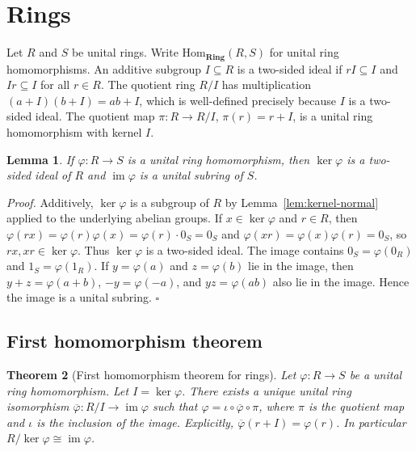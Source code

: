 \documentclass[11pt,letterpaper]{article}
\newcommand{\Map}[3]{#1 \colon #2 \to #3}
\newcommand{\RingHom}{\mathrm{Hom}_{\mathbf{Ring}}}
\newtheorem{theorem}{Theorem}
\newtheorem{lemma}[theorem]{Lemma}
\newenvironment{proof}{\noindent\textit{Proof.}}{\hfill\(\square\)}
\begin{document}
\section{Rings}

Let \(R\) and \(S\) be unital rings. Write \(\RingHom(R,S)\) for unital ring homomorphisms. An additive subgroup \(I\subseteq R\) is a two-sided ideal if \(rI\subseteq I\) and \(Ir\subseteq I\) for all \(r\in R\). The quotient ring \(R/I\) has multiplication \((a+I)(b+I)=ab+I\), which is well-defined precisely because \(I\) is a two-sided ideal. The quotient map \(\Map{\pi}{R}{R/I}\), \(\pi(r)=r+I\), is a unital ring homomorphism with kernel \(I\).

\begin{lemma}
\label{lem:ring-kernel}
If \(\Map{\varphi}{R}{S}\) is a unital ring homomorphism, then \(\ker\varphi\) is a two-sided ideal of \(R\) and \(\operatorname{im}\varphi\) is a unital subring of \(S\).
\end{lemma}

\begin{proof}
Additively, \(\ker\varphi\) is a subgroup of \(R\) by Lemma~\ref{lem:kernel-normal} applied to the underlying abelian groups. If \(x\in\ker\varphi\) and \(r\in R\), then \(\varphi(rx)=\varphi(r)\varphi(x)=\varphi(r)\cdot 0_S=0_S\) and \(\varphi(xr)=\varphi(x)\varphi(r)=0_S\), so \(rx,xr\in\ker\varphi\). Thus \(\ker\varphi\) is a two-sided ideal. The image contains \(0_S=\varphi(0_R)\) and \(1_S=\varphi(1_R)\). If \(y=\varphi(a)\) and \(z=\varphi(b)\) lie in the image, then \(y+z=\varphi(a+b)\), \(-y=\varphi(-a)\), and \(yz=\varphi(ab)\) also lie in the image. Hence the image is a unital subring.
\end{proof}

\subsection{First homomorphism theorem}

\begin{theorem}[First homomorphism theorem for rings]
\label{thm:ring-first}
Let \(\Map{\varphi}{R}{S}\) be a unital ring homomorphism. Let \(I=\ker\varphi\). There exists a unique unital ring isomorphism \(\Map{\overline{\varphi}}{R/I}{\operatorname{im}\varphi}\) such that \(\varphi=\iota\circ\overline{\varphi}\circ\pi\), where \(\pi\) is the quotient map and \(\iota\) is the inclusion of the image. Explicitly, \(\overline{\varphi}(r+I)=\varphi(r)\). In particular \(R/\ker\varphi\cong\operatorname{im}\varphi\).
\end{theorem}
\end{document}
